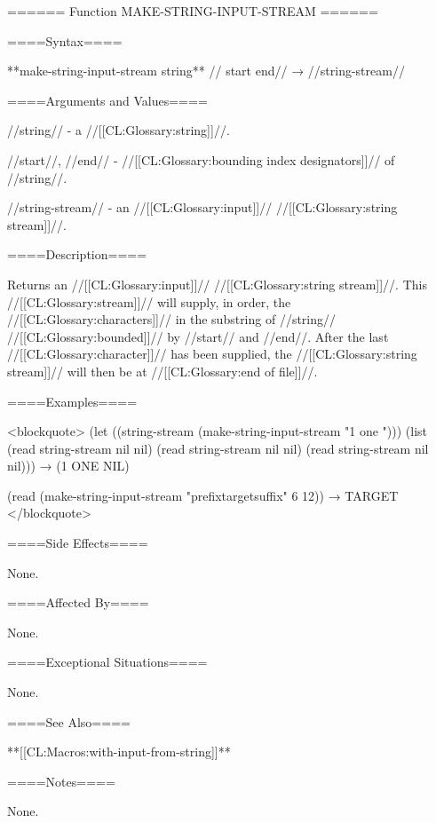 ====== Function MAKE-STRING-INPUT-STREAM ======

====Syntax====

**make-string-input-stream {string** //\opt} start end// → //string-stream//

====Arguments and Values====

//string// - a //[[CL:Glossary:string]]//.

//start//, //end// - //[[CL:Glossary:bounding index designators]]// of //string//. 

//string-stream// - an //[[CL:Glossary:input]]// //[[CL:Glossary:string stream]]//.

====Description====

Returns an //[[CL:Glossary:input]]// //[[CL:Glossary:string stream]]//. This //[[CL:Glossary:stream]]// will supply, in order, the //[[CL:Glossary:characters]]// in the substring of //string// //[[CL:Glossary:bounded]]// by //start// and //end//. After the last //[[CL:Glossary:character]]// has been supplied, the //[[CL:Glossary:string stream]]// will then be at //[[CL:Glossary:end of file]]//.

====Examples====

<blockquote> (let ((string-stream (make-string-input-stream "1 one "))) (list (read string-stream nil nil) (read string-stream nil nil) (read string-stream nil nil))) → (1 ONE NIL)

(read (make-string-input-stream "prefixtargetsuffix" 6 12)) → TARGET </blockquote>

====Side Effects====

None.

====Affected By====

None.

====Exceptional Situations====

None.

====See Also====

**[[CL:Macros:with-input-from-string]]**

====Notes====

None.

 
